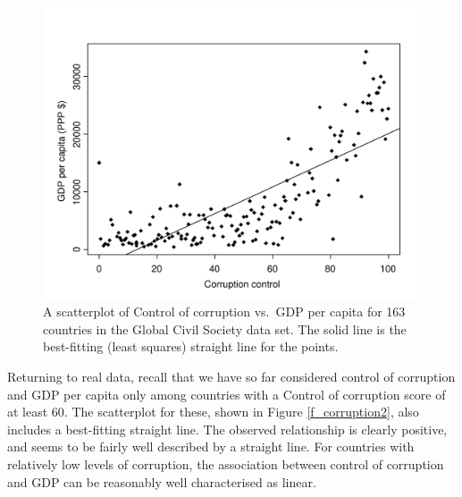 \begin{figure}[t]
\caption{A scatterplot of Control of corruption vs.\ GDP per capita for
163 countries in the Global Civil Society data set. The solid line is
the best-fitting (least squares) straight line for the points.}
\label{f_corruption3}

\includegraphics[width=13.5cm]{corruption3}

\end{figure}

Returning to real data, recall that we have so far considered control
of corruption and GDP per capita only among countries with a Control of
corruption score of at least 60. The scatterplot for these, shown in
Figure \ref{f_corruption2}, also includes a best-fitting straight line.
The observed relationship is clearly positive, and seems to be fairly
well described by a straight line. For countries with relatively low
levels of corruption, the association between control of corruption and GDP can
be reasonably well characterised as linear.

